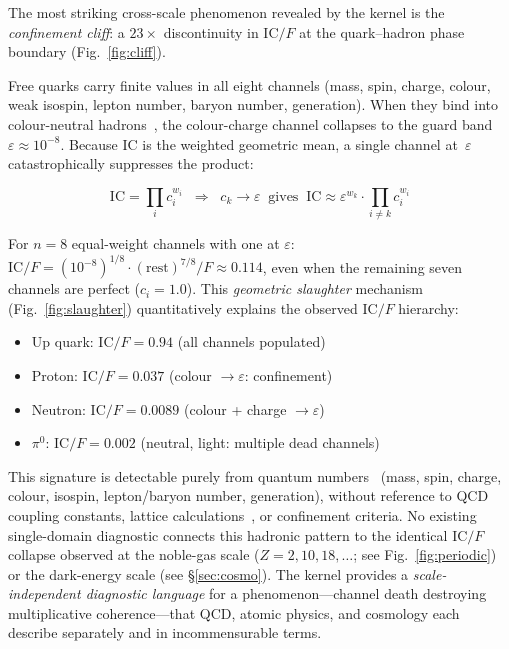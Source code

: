\documentclass[
  aps,
  prx,
  twocolumn,
  superscriptaddress,
  nofootinbib,
  floatfix
]{revtex4-2}
\newcommand{\eps}{\varepsilon}
\newcommand{\IC}{\mathrm{IC}}
\begin{document}
The most striking cross-scale phenomenon revealed by the kernel is the
\emph{confinement cliff}: a $23\times$ discontinuity in $\IC/F$
at the quark--hadron phase boundary (Fig.~\ref{fig:cliff}).

Free quarks carry finite values in all eight channels (mass, spin,
charge, colour, weak isospin, lepton number, baryon number,
generation). When they bind into colour-neutral hadrons~\cite{wilson1974confinement},
the colour-charge channel collapses to the guard band
$\eps \approx 10^{-8}$. Because $\IC$ is the weighted geometric
mean, a single channel at~$\eps$ catastrophically suppresses
the product:

\begin{equation}
  \IC = \prod_i c_i^{w_i} \;\;\Longrightarrow\;\;
  c_k \to \eps \;\;\text{gives}\;\;
  \IC \approx \eps^{w_k} \cdot \prod_{i \neq k} c_i^{w_i}
  \label{eq:slaughter}
\end{equation}

For $n = 8$ equal-weight channels with one at $\eps$:
$\IC/F = (10^{-8})^{1/8} \cdot (\text{rest})^{7/8} / F
\approx 0.114$,
even when the remaining seven channels are perfect
($c_i = 1.0$). This \emph{geometric slaughter} mechanism
(Fig.~\ref{fig:slaughter}) quantitatively explains the observed
$\IC/F$ hierarchy:

\begin{itemize}[leftmargin=1.5em,itemsep=1pt]
\item Up quark: $\IC/F = 0.94$ (all channels populated)
\item Proton: $\IC/F = 0.037$ (colour $\to \eps$: confinement)
\item Neutron: $\IC/F = 0.0089$ (colour + charge $\to \eps$)
\item $\pi^0$: $\IC/F = 0.002$ (neutral, light: multiple
  dead channels)
\end{itemize}

This signature is detectable purely from quantum
numbers~\cite{pdg2024} (mass, spin, charge, colour, isospin,
lepton/baryon number, generation), without reference to
QCD coupling constants, lattice calculations~\cite{aoki2006lattice},
or confinement criteria. No existing single-domain diagnostic
connects this hadronic pattern to the identical $\IC/F$ collapse
observed at the noble-gas scale ($Z = 2, 10, 18, \ldots$; see
Fig.~\ref{fig:periodic}) or the dark-energy scale (see
\S\ref{sec:cosmo}). The kernel provides a \emph{scale-independent
diagnostic language} for a phenomenon---channel death destroying
multiplicative coherence---that QCD, atomic physics, and cosmology
each describe separately and in incommensurable terms.
\end{document}
